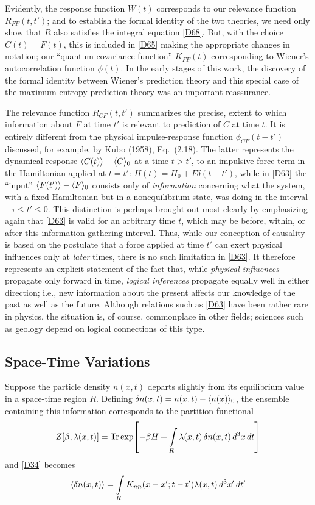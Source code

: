 Evidently, the response function $W(t)$ corresponds to our relevance function $R_{FF}(t, t')$; and to establish the formal identity of the two theories, we need only show that $R$ also satisfies the integral equation \eqref{D68}.
But, with the choice $C(t) = F(t)$, this is included in \eqref{D65} making the appropriate changes in notation; our ``quantum covariance function'' $K_{FF}(t)$ corresponding to Wiener's autocorrelation function $\phi(t)$.
In the early stages of this work, the discovery of the formal identity between Wiener's prediction theory and this special case of the maximum-entropy prediction theory was an important reassurance.

The relevance function $R_{CF}(t, t')$ summarizes the precise, extent to which information about $F$ at time $t'$ is relevant to prediction of $C$ at time $t$.
It is entirely different from the physical impulse-response function $\phi_{CF}(t - t')$ discussed, for example, by Kubo (\cite{kubo58}{1958}), Eq.~(2.18).
The latter represents the dynamical response $\langle C(t)\rangle - \langle C\rangle_0$ at a time $t > t'$, to an impulsive force term in the Hamiltonian applied at $t = t'$: $H(t) = H_0 + F \delta(t-t')$, while in \eqref{D63} the ``input'' $\langle F(t')\rangle- \langle F\rangle_0$ consists only of \emph{information} concerning what the system, with a  fixed Hamiltonian but in a nonequilibrium state, was doing in the interval $-\tau \leq t' \leq 0$.
This distinction is perhaps brought out most clearly by emphasizing again that \eqref{D63} is valid for an arbitrary time $t$, which may be before, within, or after this information-gathering interval.
Thus, while our conception of causality is based on the postulate that a force applied at time $t'$ can exert physical influences only at \emph{later} times, there is no such limitation in \eqref{D63}.
It therefore represents an explicit statement of the fact that, while \emph{physical influences} propagate only forward in time, \emph{logical inferences} propagate equally well in either direction; i.e., new information about the present affects our knowledge of the past as well as the future.
Although relations such as \eqref{D63} have been rather rare in physics, the situation is, of course, commonplace in other fields; sciences such as geology depend on logical connections of this type.


\subsection{Space-Time Variations}
Suppose the particle density $n(x, t)$ departs slightly from its equilibrium value in a space-time region $R$.
Defining $\mathop{}\!\delta n(x, t) = n(x, t) - \langle n(x)\rangle_0$, the ensemble containing this information corresponds to the partition functional
\begin{equation}
	\label{D70}
	Z[\beta, \lambda(x, t)] = \Tr \exp \left[-\beta H + \int\limits_{R} \lambda(x, t) \ddel n(x, t) \dd^3 x \dd t \right]
\end{equation}
and \eqref{D34} becomes
\begin{equation}
	\label{D71}
	\langle\mathop{}\!\delta n(x, t)\rangle = \int\limits_{R} K_{nn} (x - x'; t - t') \lambda(x, t) \mathop{}\!d^3 x' \mathop{}\!d t'
\end{equation}

